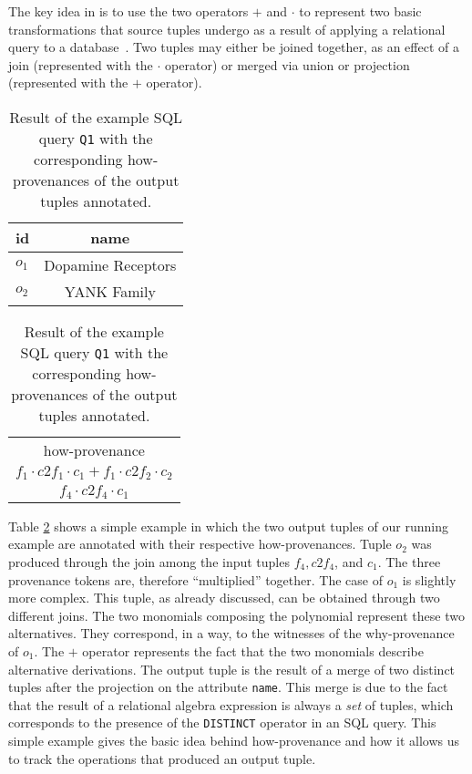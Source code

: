 The key idea in \citet{howProvenanceGreen} is to use the two operators $+$ and $\cdot$ to represent two basic transformations that source tuples undergo as a result of applying a relational query to a database~\citep{CheneyProvSurvey}. 
Two tuples may either be joined together, as an effect of a join (represented with the $\cdot$ operator) or merged via union or projection (represented with the $+$ operator).

 

\begin{table}[]
\centering
  \begin{tabular}{|l|c|}
  \hline
    id & name\\
    \hline
    $o_1$ &  Dopamine Receptors\\
    $o_2$ & YANK Family\\
    \hline
  \end{tabular}
  \begin{tabular}{c}
  	how-provenance   \\
  	$f_1 \cdot c2f_1 \cdot c_1 + f_1 \cdot c2f_2 \cdot c_2$ \\
  	$f_4 \cdot c2f_4 \cdot c_1$ \\
  \end{tabular}
    \caption{Result of the example SQL query \texttt{Q1} with the corresponding how-provenances of the output tuples annotated.}
  \label{table:result_how_prov}
\end{table} 

Table \ref{table:result_how_prov} shows a simple example in which the two output tuples of our running example are annotated with their respective how-provenances. 
Tuple $o_2$ was produced through the join among the input tuples $f_4, c2f_4$, and $c_1$. The three provenance tokens are, therefore  ``multiplied'' together. 
The case of $o_1$ is slightly more complex. This tuple, as already discussed, can be obtained through two different joins. The two monomials composing the polynomial represent these two alternatives. They correspond, in a way, to the witnesses of the why-provenance of $o_1$.
The $+$ operator represents the fact that the two monomials describe alternative derivations. The output tuple is the result of a merge of two distinct tuples after the projection on the attribute \texttt{name}. This merge is due to the fact that the result of a relational algebra expression is always a {\em set} of tuples, which corresponds to the presence of the \texttt{DISTINCT} operator in an SQL query. 
This simple example gives the basic idea behind how-provenance and how it allows us to track the operations that produced an output tuple. 

